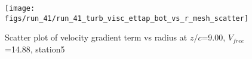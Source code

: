 \begin{figure}[H]
\centering
\texttt{[image: figs/run\_41/run\_41\_turb\_visc\_ettap\_bot\_vs\_r\_mesh\_scatter]}
\caption{Scatter plot of velocity gradient term vs radius at $z/c$=9.00, $V_{free}$=14.88, station5}
\label{fig:run_41_turb_visc_ettap_bot_vs_r_mesh_scatter}
\end{figure}


